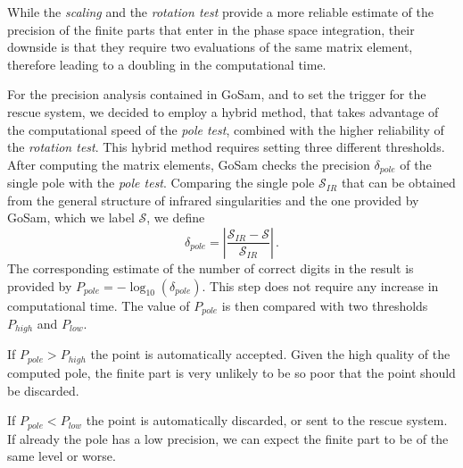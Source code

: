 \documentclass[11pt,a4paper]{refrep}
\newcommand{\gosamversion}{{3{.}0}}
\newcommand{\gosamv}[1][\gosamversion]{{\sc GoSam}\xspace}
\def\N{\mathcal{N}}
\def\S{\mathcal{S}}
\newcommand{\be}{\begin{equation}}
\newcommand{\ee}{\end{equation}}
\begin{document}
While  the {\it scaling} and the {\it rotation test} provide a more reliable estimate of the precision of the finite parts that enter in the phase space integration, their downside is that they require two evaluations of the same matrix element, therefore leading to a doubling in the computational time.


For the precision analysis contained in \gosamv, and to set the trigger for the rescue system, we decided to employ  a hybrid method, that takes advantage of the computational speed of the {\it pole test}, combined with the higher reliability of the {\it rotation test}.  This hybrid method requires setting three different thresholds.
After computing the matrix elements, \gosamv{} checks the precision  $ \delta_{pole}$ of the single pole with the {\it pole test}. Comparing the single pole 
$\S_{IR}$ that can be obtained from the general structure of infrared singularities and the one provided by  \gosamv, which we label $\S$, we define  
\be \label{eq:exd}
\delta_{pole} = \left | \frac{ \S_{IR} - \S{} }{ \S_{IR}} \right |\, .
\ee
The corresponding estimate of the number of correct digits in the result is provided by  $P_{pole}= - \log_{10} (\delta_{pole})$. This step does not require any increase in computational time. The value of $ P_{pole}$ is then compared with two thresholds $ P_{high}$ and $ P_{low}$. 

If $P_{pole} >  P_{high}$ the point is automatically accepted. Given the high quality of the computed pole, the finite part is very unlikely to be so poor that the point should be discarded.

If $P_{pole} <  P_{low}$ the point is automatically discarded, or sent to the rescue system. If already the pole has a low precision, we can expect the finite part to be of the same level or worse.
 
\end{document}
